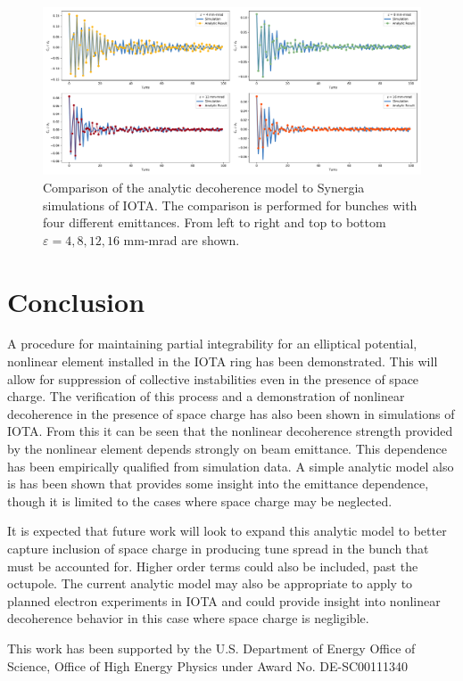 \documentclass[aps,prstab,twocolumn, groupedaddress]{revtex4-1}
\begin{document}
\begin{figure}
	\vspace*{-.75\baselineskip}
	\centering
	\includegraphics*[width=\textwidth]{analytic_simulation_data.pdf}
	\caption{Comparison of the analytic decoherence model to Synergia simulations of 
		IOTA. The comparison is performed for bunches with four different emittances. From 
		left to right and top to bottom $\varepsilon= 4, 8, 12, 16$ mm-mrad are shown. }
	\label{fig:analyticsim}
\end{figure}


\section{Conclusion}
A procedure for maintaining  partial integrability for an elliptical potential, nonlinear 
element installed in the IOTA ring has been demonstrated. This will allow for suppression 
of collective instabilities even in the presence of space charge. The verification of this 
process and a demonstration of nonlinear decoherence in the presence of space charge 
has also been shown in simulations of IOTA. From this it can be seen that the nonlinear 
decoherence strength provided by the nonlinear element depends strongly on beam 
emittance. This dependence has been empirically qualified from simulation data. A simple 
analytic model also is has been shown that provides some insight into the emittance 
dependence, though it is limited to the cases where space charge may be neglected.

It is expected that future work will look to expand this analytic model to better capture 
inclusion of space charge in producing tune spread in the bunch that must be accounted 
for. Higher order terms could also be included, past the octupole. The current analytic 
model may also be appropriate to apply to planned electron experiments in IOTA and 
could provide insight into nonlinear decoherence behavior in this case where space 
charge is negligible. 

\begin{acknowledgments}
This work has been supported by the U.S. Department of Energy Office of Science, Office 
of High Energy Physics under Award No. DE-SC00111340
\end{acknowledgments}
\FloatBarrier


\end{document}
